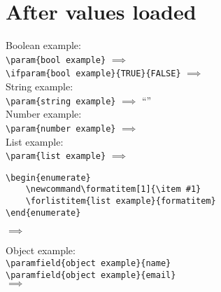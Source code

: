 \documentclass{article}
\begin{document}
    \section*{After values loaded}

    Boolean example:\\

    \lstinline[style=TeX,morekeywords={param}]|\param{bool example}|
    $\implies$
    \\

    \lstinline[style=TeX,morekeywords={ifparam}]|\ifparam{bool example}{TRUE}{FALSE}|
    $\implies$
    \\

    String example:\\

    \lstinline[style=TeX,morekeywords={param}]|\param{string example}|
    $\implies$
    ``''\\

    Number example:\\

    \lstinline[style=TeX,morekeywords={param}]|\param{number example}|
    $\implies$
    \\

    List example:\\

    \lstinline[style=TeX,morekeywords={param}]|\param{list example}|
    $\implies$
    \\

    \begin{lstlisting}[language={[LaTeX]TeX},morekeywords={formatitem,forlistitem}]
\begin{enumerate}
    \newcommand\formatitem[1]{\item #1}
    \forlistitem{list example}{formatitem}
\end{enumerate}
    \end{lstlisting}
    $\implies$
    \begin{enumerate}
        \newcommand\formatitem[1]{\item #1}
    \end{enumerate}

    Object example:\\

    \lstinline[style=TeX,morekeywords={paramfield}]|\paramfield{object example}{name}|\\
    \lstinline[style=TeX,morekeywords={paramfield}]|\paramfield{object example}{email}|\\
    $\implies$
    \\
\end{document}
